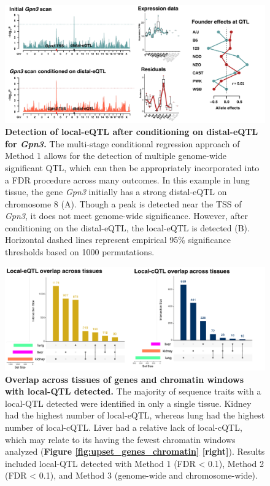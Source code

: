 \documentclass[9pt,twocolumn,twoside]{gsajnl}
\begin{document}
\clearpage

\begin{figure}[hp]
\renewcommand{\familydefault}{\sfdefault}\normalfont
\centering
\includegraphics[width=\textwidth, trim={0in 0in 0in 0in}, clip]{figs/gpn3_conditional_scan.pdf}
\caption{\textbf{Detection of local-eQTL after conditioning on distal-eQTL for \textit{Gpn3}.} The multi-stage conditional regression approach of Method 1 allows for the detection of multiple genome-wide significant QTL, which can then be appropriately incorporated into a FDR procedure across many outcomes. In this example in lung tissue, the gene \textit{Gpn3} initially has a strong distal-eQTL on chromosome 8 (A). Though a peak is detected near the TSS of \textit{Gpn3}, it does not meet genome-wide significance. However, after conditioning on the distal-eQTL, the local-eQTL is detected (B). Horizontal dashed lines represent empirical 95\% significance thresholds based on 1000 permutations.
\label{fig:conditional_scans}}
\end{figure}

\begin{figure}[hp]
\renewcommand{\familydefault}{\sfdefault}\normalfont
\centering
\includegraphics[width=\textwidth, trim={0in 0in 0in 0in}, clip]{figs/upset_eqtl_cqtl.pdf}
\caption{\textbf{Overlap across tissues of genes and chromatin windows with local-QTL detected.} The majority of sequence traits with a local-QTL detected were identified in only a single tissue. Kidney had the highest number of local-eQTL, whereas lung had the highest number of local-cQTL. Liver had a relative lack of local-cQTL, which may relate to its having the fewest chromatin windows analyzed (\textbf{Figure \ref{fig:upset_genes_chromatin} [right]}). Results included local-QTL detected with Method 1 (FDR < 0.1), Method 2 (FDR < 0.1), and Method 3 (genome-wide and chromosome-wide). 
\label{fig:upset_eqtl_cqtl}}
\end{figure}
\end{document}
